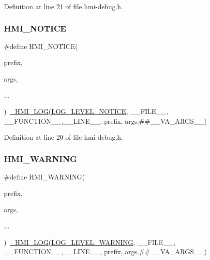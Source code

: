 Definition at line 21 of file hmi-\/debug.\+h.

\mbox{\label{hmi-debug_8h_abc0d6e0760017d8ae48b836925b2ef15}} 
\subsubsection{\texorpdfstring{H\+M\+I\+\_\+\+N\+O\+T\+I\+CE}{HMI\_NOTICE}}
{\footnotesize\ttfamily \#define H\+M\+I\+\_\+\+N\+O\+T\+I\+CE(\begin{DoxyParamCaption}\item[{}]{prefix,  }\item[{}]{args,  }\item[{}]{... }\end{DoxyParamCaption})~\hyperlink{hmi-debug_8h_a0846b9d51e2e0612c4825a9a581aa40a}{\+\_\+\+H\+M\+I\+\_\+\+L\+OG}(\hyperlink{hmi-debug_8h_aa5a9053636a30269210c54e734e0d583a23ae4d711a7bbb3900240cb7316b4b4e}{L\+O\+G\+\_\+\+L\+E\+V\+E\+L\+\_\+\+N\+O\+T\+I\+CE}, \+\_\+\+\_\+\+F\+I\+L\+E\+\_\+\+\_\+, \+\_\+\+\_\+\+F\+U\+N\+C\+T\+I\+O\+N\+\_\+\+\_\+,\+\_\+\+\_\+\+L\+I\+N\+E\+\_\+\+\_\+, prefix, args,\#\#\+\_\+\+\_\+\+V\+A\+\_\+\+A\+R\+G\+S\+\_\+\+\_\+)}



Definition at line 20 of file hmi-\/debug.\+h.

\mbox{\label{hmi-debug_8h_a25361812432cd2480bc8f1a8e56ecbf7}} 
\subsubsection{\texorpdfstring{H\+M\+I\+\_\+\+W\+A\+R\+N\+I\+NG}{HMI\_WARNING}}
{\footnotesize\ttfamily \#define H\+M\+I\+\_\+\+W\+A\+R\+N\+I\+NG(\begin{DoxyParamCaption}\item[{}]{prefix,  }\item[{}]{args,  }\item[{}]{... }\end{DoxyParamCaption})~\hyperlink{hmi-debug_8h_a0846b9d51e2e0612c4825a9a581aa40a}{\+\_\+\+H\+M\+I\+\_\+\+L\+OG}(\hyperlink{hmi-debug_8h_aa5a9053636a30269210c54e734e0d583a5b4dd81b4dc7eefbc55ba03415c627ef}{L\+O\+G\+\_\+\+L\+E\+V\+E\+L\+\_\+\+W\+A\+R\+N\+I\+NG}, \+\_\+\+\_\+\+F\+I\+L\+E\+\_\+\+\_\+, \+\_\+\+\_\+\+F\+U\+N\+C\+T\+I\+O\+N\+\_\+\+\_\+,\+\_\+\+\_\+\+L\+I\+N\+E\+\_\+\+\_\+, prefix, args,\#\#\+\_\+\+\_\+\+V\+A\+\_\+\+A\+R\+G\+S\+\_\+\+\_\+)}



